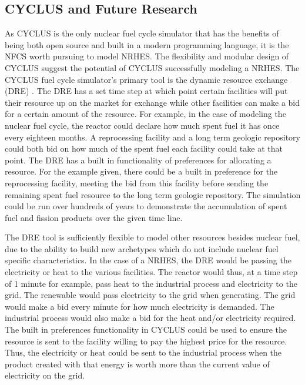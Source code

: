 \documentclass{article}                                                                           %
\begin{document}
\begin{linenumbers}
\section{CYCLUS and Future Research}

As CYCLUS is the only nuclear fuel cycle simulator that has the benefits of being both open source and built in a modern programming language, it is the NFCS worth pursuing to model NRHES. The flexibility and modular design of CYCLUS suggest the potential of CYCLUS successfully modeling a NRHES. The CYCLUS fuel cycle simulator's primary tool is the dynamic resource exchange (DRE) \cite{Huff2016}.  The DRE has a set time step at which point certain facilities will put their resource up on the market for exchange while other facilities can make a bid for a certain amount of the resource. For example, in the case of modeling the nuclear fuel cycle, the reactor could declare how much spent fuel it has once every eighteen months.  A reprocessing facility and a long term geologic repository could both bid on how much of the spent fuel each facility could take at that point.  The DRE has a built in functionality of preferences for allocating a resource.  For the example given, there could be a built in preference for the reprocessing facility, meeting the bid from this facility before sending the remaining spent fuel resource to the long term geologic repository. The simulation could be run over hundreds of years to demonstrate the accumulation of spent fuel and fission products over the given time line. 

The DRE tool is sufficiently flexible to model other resources besides nuclear fuel, due to the ability to build new archetypes which do not include nuclear fuel specific characteristics.  In the case of a NRHES, the DRE would be passing the electricity or heat to the various facilities.  The reactor would thus, at a time step of 1 minute for example, pass heat to the industrial process and electricity to the grid.  The renewable would pass electricity to the grid when generating.  The grid would make a bid every minute for how much electricity is demanded.  The industrial process would also make a bid for the heat and/or electricity required.  The built in preferences functionality in CYCLUS could be used to ensure the resource is sent to the facility willing to pay the highest price for the resource.  Thus, the electricity or heat could be sent to the industrial process when the product created with that energy is worth more than the current value of electricity on the grid.
% 
% 


\end{linenumbers}
\end{document}
